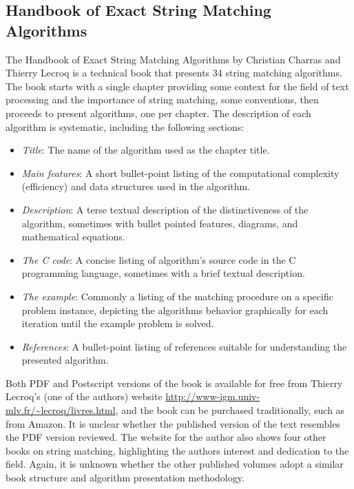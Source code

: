 \documentclass[a4paper, 11pt]{article}
\begin{document}
% 
% 
\subsection{Handbook of Exact String Matching Algorithms}
\label{subsec:strings}
The Handbook of Exact String Matching Algorithms by Christian Charras and Thierry Lecroq \cite{Charras2004} is a technical book that presents 34 string matching algorithms. The book starts with a single chapter providing some context for the field of text processing and the importance of string matching, some conventions, then proceeds to present algorithms, one per chapter. The description of each algorithm is systematic, including the following sections:

\begin{itemize}
	\item \emph{Title}: The name of the algorithm used as the chapter title.
	\item \emph{Main features}: A short bullet-point listing of the computational complexity (efficiency) and data structures used in the algorithm.
	\item \emph{Description}: A terse textual description of the distinctiveness of the algorithm, sometimes with bullet pointed features, diagrams, and mathematical equations. 
	\item \emph{The C code}: A concise listing of algorithm's source code in the C programming language, sometimes with a brief textual description.
	\item \emph{The example}: Commonly a listing of the matching procedure on a specific problem instance, depicting the algorithms behavior graphically for each iteration until the example problem is solved.
	\item \emph{References}: A bullet-point listing of references suitable for understanding the presented algorithm.
\end{itemize}

Both PDF and Postscript versions of the book is available for free from Thierry Lecroq's (one of the authors) website \url{http://www-igm.univ-mlv.fr/~lecroq/livres.html}, and the book can be purchased traditionally, such as from Amazon. It is unclear whether the published version of the text resembles the PDF version reviewed. The website for the author also shows four other books on string matching, highlighting the authors interest and dedication to the field. Again, it is unknown whether the other published volumes adopt a similar book structure and algorithm presentation methodology.
\end{document}
